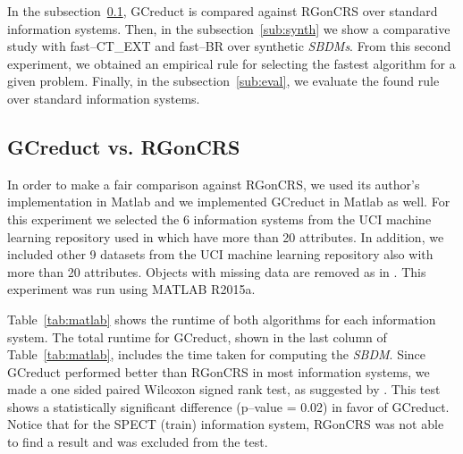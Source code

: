 \documentclass[authoryear,preprint,review,12pt]{elsarticle}
\begin{document}
	In the subsection~\ref{sub:matlab}, GCreduct is compared against RGonCRS over standard information systems. Then, in the subsection~\ref{sub:synth} we show a comparative study with fast--CT\_EXT and fast--BR over synthetic \textit{SBDMs}. From this second experiment, we obtained an empirical rule for selecting the fastest algorithm for a given problem. Finally, in the  subsection~\ref{sub:eval}, we evaluate the found rule over standard information systems.
	
\subsection{GCreduct vs. RGonCRS}\label{sub:matlab}
	In order to make a fair comparison against RGonCRS, we used its author's implementation in Matlab and we implemented GCreduct in Matlab as well. For this experiment we selected the 6 information systems from the UCI machine learning repository \citep{Bache13} used in \citep{Lias13,Sanchez10,WangP07} which have more than 20 attributes. In addition, we included other 9 datasets from the UCI machine learning repository also with more than 20 attributes. Objects with missing data are removed as in \citep{WangP07}. This experiment was run using MATLAB R2015a.
	
	Table~\ref{tab:matlab} shows the runtime of both algorithms for each information system. The total runtime for GCreduct, shown in the last column of Table~\ref{tab:matlab}, includes the time taken for computing the \textit{SBDM}. Since GCreduct performed better than RGonCRS in most information systems, we made a one sided paired Wilcoxon signed rank test, as suggested by \cite{Demsar2006}. This test shows a statistically significant difference (p--value = 0.02) in favor of GCreduct. Notice that for the SPECT (train) information system, RGonCRS was not able to find a result and was excluded from the test.
	
\end{document}
